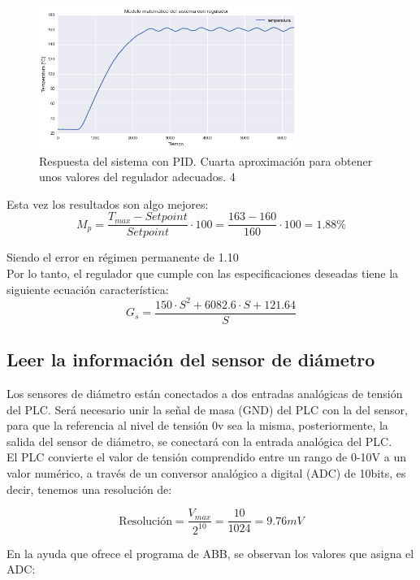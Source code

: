 \begin{figure}[H]
    \centering
    \includegraphics[width=0.75\textwidth]{images/PLC/modelado/modelado_38_1.png}
    \caption[Respuesta del sistema con PID. Iteracción 4]{Respuesta del sistema con PID. Cuarta aproximación para obtener unos valores del regulador adecuados. 4}
    \label{fig:plc_PID4}
\end{figure}

Esta vez los resultados son algo mejores:
$$M_{p}=\frac{T_{max}-Setpoint}{Setpoint} \cdot 100 = \frac{163-160}{160} \cdot 100 = 1.88\%$$ 

Siendo el error en régimen permanente de 1.10\\

Por lo tanto, el regulador que cumple con las especificaciones deseadas tiene la siguiente ecuación característica:
$$G_s = \frac{150 \cdot S^2 + 6082.6 \cdot S + 121.64}{S}$$

\subsection{Leer la información del sensor de diámetro}
\label{sec:plc_diametro}

Los sensores de diámetro están conectados a dos entradas analógicas de tensión del PLC. Será necesario unir la señal de masa (GND) del PLC con la del sensor, para que la referencia al nivel de tensión 0v sea la misma, posteriormente, la salida del sensor de diámetro, se conectará con la entrada analógica del PLC.\\

El PLC convierte el valor de tensión comprendido entre un rango de 0-10V a un valor numérico, a través de un conversor analógico a digital (ADC) de 10bits, es decir, tenemos una resolución de:

$$ \text{Resolución}=\frac{ V_{max} } {2^{10} } = \frac{10}{1024} = 9.76 mV$$

En la ayuda que ofrece el programa de ABB, se observan los valores que asigna el ADC:

